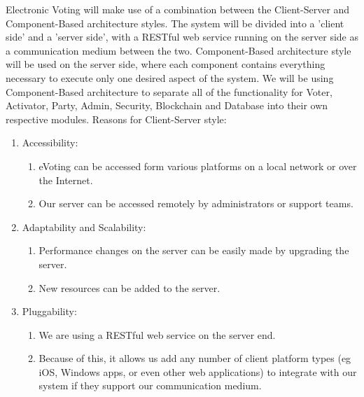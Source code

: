 Electronic Voting will make use of a combination between the Client-Server and Component-Based architecture styles. The system will be divided into a 'client side' and a 'server side', with a RESTful web service running on the server side as a communication medium between the two. Component-Based architecture style will be used on the server side, where each component contains everything necessary to execute only one desired aspect of the system.
We will be using Component-Based architecture to separate all of the functionality for Voter, Activator, Party, Admin, Security, Blockchain and Database into their own respective modules. Reasons for Client-Server style:
	\begin{enumerate}
		\item Accessibility:
		\begin{enumerate}
			\item eVoting can be accessed form various platforms on a local network or over the Internet.
			\item Our server can be accessed remotely by administrators or support teams.
		\end{enumerate}
		\item Adaptability and Scalability:
		\begin{enumerate}
			\item Performance changes on the server can be easily made by upgrading the server.
			\item New resources can be added to the server.
		\end{enumerate}
		\item Pluggability:
		\begin{enumerate}
			\item We are using a RESTful web service on the server end.
			\item Because of this, it allows us add any number of client platform types (eg iOS, Windows apps, or even other web applications) to integrate with our system if they support our communication medium.
		\end{enumerate}
	\end{enumerate}
	
